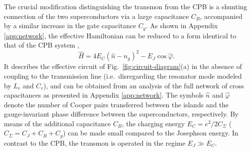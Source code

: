 \documentclass[twocolumn,amsmath,amssymb,floatfix,pra,showpacs,eqsecnum,footinbib,superscriptaddress]{revtex4}
\newcounter{fig}
\newcommand{\be}{\begin{equation}}
\newcommand{\ee}{\end{equation}}
\begin{document}
The crucial modification distinguishing the transmon from the CPB is a shunting connection of the two superconductors via a large capacitance $C_B$, accompanied by a similar increase in the gate capacitance $C_g$. As shown in Appendix \ref{app:network}, the  effective Hamiltonian can be reduced to a form identical to that of the CPB system \cite{devoret2},
\be
\hat{H}=4E_C\left(\hat{n}-n_g\right)^2 - E_J \cos \hat{\varphi}.
\label{CPB-gen}
\ee
It describes the effective circuit of Fig.~\ref{fig:circuit-diagram}(a) in the absence of coupling to the transmission line (i.e.\ disregarding the resonator mode modeled by $L_r$ and $C_r$), and can be obtained from an analysis of the full network of cross capacitances as presented in Appendix \ref{app:network}.
The symbols $\hat{n}$ and $\hat{\varphi}$ denote the number of Cooper pairs transferred between the islands and the gauge-invariant phase difference between the superconductors, respectively.  By means of the additional capacitance $C_B$, the charging energy $E_C=e^2/2C_\Sigma$ ($C_\Sigma=C_J+C_B+C_g$) can be made small compared to the Josephson energy. In contrast to the CPB, the transmon is operated in the regime $E_J\gg E_C$. 
\end{document}
